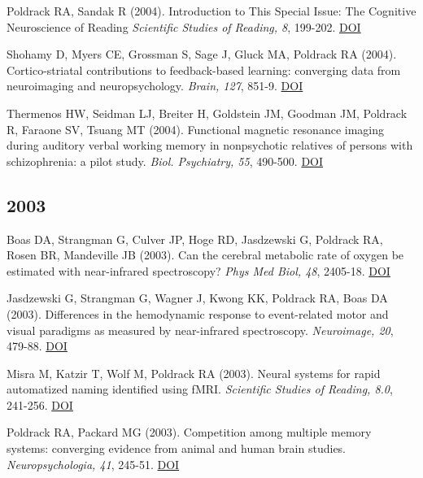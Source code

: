 Poldrack RA, Sandak R (2004). Introduction to This Special Issue: The Cognitive Neuroscience of Reading \textit{Scientific Studies of Reading, 8}, 199-202. \href{http://dx.doi.org/10.1207/s1532799xssr0803\_1}{DOI} \vspace{2mm}

Shohamy D, Myers CE, Grossman S, Sage J, Gluck MA, Poldrack RA (2004). Cortico-striatal contributions to feedback-based learning: converging data from neuroimaging and neuropsychology. \textit{Brain, 127}, 851-9. \href{http://dx.doi.org/10.1093/brain/awh100}{DOI} \vspace{2mm}

Thermenos HW, Seidman LJ, Breiter H, Goldstein JM, Goodman JM, Poldrack R, Faraone SV, Tsuang MT (2004). Functional magnetic resonance imaging during auditory verbal working memory in nonpsychotic relatives of persons with schizophrenia: a pilot study. \textit{Biol. Psychiatry, 55}, 490-500. \href{http://dx.doi.org/10.1016/j.biopsych.2003.11.014}{DOI} \vspace{2mm}

\subsection*{2003}

Boas DA, Strangman G, Culver JP, Hoge RD, Jasdzewski G, Poldrack RA, Rosen BR, Mandeville JB (2003). Can the cerebral metabolic rate of oxygen be estimated with near-infrared spectroscopy? \textit{Phys Med Biol, 48}, 2405-18. \href{http://dx.doi.org/10.1088/0031-9155/48/15/311}{DOI} \vspace{2mm}

Jasdzewski G, Strangman G, Wagner J, Kwong KK, Poldrack RA, Boas DA (2003). Differences in the hemodynamic response to event-related motor and visual paradigms as measured by near-infrared spectroscopy. \textit{Neuroimage, 20}, 479-88. \href{http://dx.doi.org/10.1016/s1053-8119(03)00311-2}{DOI} \vspace{2mm}

Misra M, Katzir T, Wolf M, Poldrack RA (2003). Neural systems for rapid automatized naming identified using fMRI. \textit{Scientific Studies of Reading, 8.0}, 241-256. \href{http://dx.doi.org/xdhzgoip}{DOI} \vspace{2mm}

Poldrack RA, Packard MG (2003). Competition among multiple memory systems: converging evidence from animal and human brain studies. \textit{Neuropsychologia, 41}, 245-51. \href{http://dx.doi.org/10.1016/s0028-3932(02)00157-4}{DOI} \vspace{2mm}

